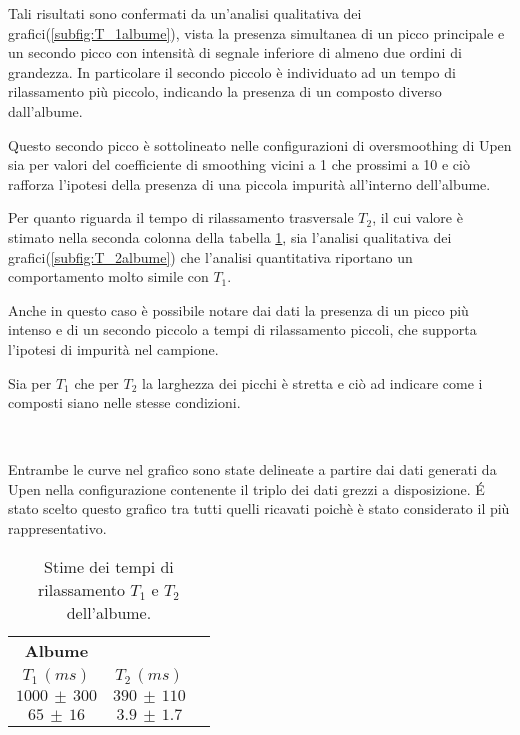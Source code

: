 Tali risultati sono confermati da un'analisi qualitativa dei grafici(\ref{subfig:T_1albume}), vista la presenza simultanea di un picco principale e un secondo picco con intensità di segnale inferiore di almeno due ordini di grandezza. 
In particolare il secondo piccolo è individuato ad un tempo di rilassamento più piccolo, indicando la presenza di un composto diverso dall'albume.

Questo secondo picco è sottolineato nelle configurazioni di oversmoothing di Upen sia per valori del coefficiente di smoothing vicini a 1 che prossimi a 10 e ciò rafforza l'ipotesi della presenza di una piccola impurità all'interno dell'albume. 

Per quanto riguarda il tempo di rilassamento trasversale $T_2$, il cui valore è stimato nella seconda colonna della tabella \ref{tab:Albume}, sia l'analisi qualitativa dei grafici(\ref{subfig:T_2albume}) che l'analisi quantitativa riportano un comportamento molto simile con $T_1$.

Anche in questo caso è possibile notare dai dati la presenza di un picco più intenso e di un secondo piccolo a tempi di rilassamento piccoli, che supporta l'ipotesi di impurità nel campione.

Sia per $T_1$ che per $T_2$ la larghezza dei picchi è stretta e ciò ad indicare come i composti siano nelle stesse condizioni. 

\begin{figure}[h]
\centering
{} \quad
{} \\
\caption{}
\label{fig:T_albume}
\end{figure}

Entrambe le curve nel grafico sono state delineate a partire dai dati generati da Upen nella configurazione contenente il triplo dei dati grezzi a disposizione.
\'E stato scelto questo grafico tra tutti quelli ricavati poichè è stato considerato il più rappresentativo.

\begin{table}[h]
	\centering
	\begin{tabular}{ccc}
	\toprule
					\textbf{Albume}	\\
		$T_1\,(ms)$ 		& 		$T_2\,(ms)$ 		\\	
	\midrule
		$1000\,\pm\,300$	&		$390\,\pm\,110$		\\
		$65\,\pm\,16$		&		$3.9\,\pm\,1.7$		\\
	\bottomrule
	\end{tabular}
	\caption{Stime dei tempi di rilassamento $T_1$ e $T_2$ dell'albume.}
	\label{tab:Albume}
\end{table}

